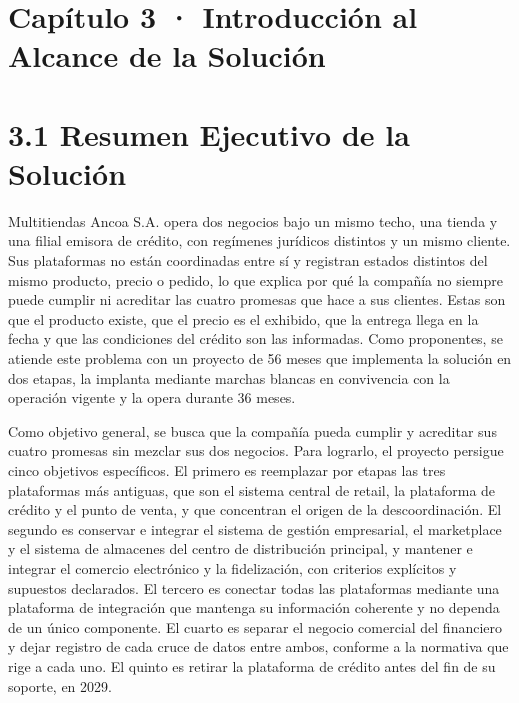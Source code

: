 \documentclass[11pt]{article}
\begin{document}
\tableofcontents
\clearpage

\section{Capítulo 3 · Introducción al Alcance de la Solución}

\section{3.1 Resumen Ejecutivo de la Solución}

Multitiendas Ancoa S.A. opera dos negocios bajo un mismo techo, una tienda y una filial emisora de crédito, con regímenes jurídicos distintos y un mismo cliente. Sus plataformas no están coordinadas entre sí y registran estados distintos del mismo producto, precio o pedido, lo que explica por qué la compañía no siempre puede cumplir ni acreditar las cuatro promesas que hace a sus clientes. Estas son que el producto existe, que el precio es el exhibido, que la entrega llega en la fecha y que las condiciones del crédito son las informadas. Como proponentes, se atiende este problema con un proyecto de 56 meses que implementa la solución en dos etapas, la implanta mediante marchas blancas en convivencia con la operación vigente y la opera durante 36 meses.

Como objetivo general, se busca que la compañía pueda cumplir y acreditar sus cuatro promesas sin mezclar sus dos negocios. Para lograrlo, el proyecto persigue cinco objetivos específicos. El primero es reemplazar por etapas las tres plataformas más antiguas, que son el sistema central de retail, la plataforma de crédito y el punto de venta, y que concentran el origen de la descoordinación. El segundo es conservar e integrar el sistema de gestión empresarial, el marketplace y el sistema de almacenes del centro de distribución principal, y mantener e integrar el comercio electrónico y la fidelización, con criterios explícitos y supuestos declarados. El tercero es conectar todas las plataformas mediante una plataforma de integración que mantenga su información coherente y no dependa de un único componente. El cuarto es separar el negocio comercial del financiero y dejar registro de cada cruce de datos entre ambos, conforme a la normativa que rige a cada uno. El quinto es retirar la plataforma de crédito antes del fin de su soporte, en 2029.
\end{document}
